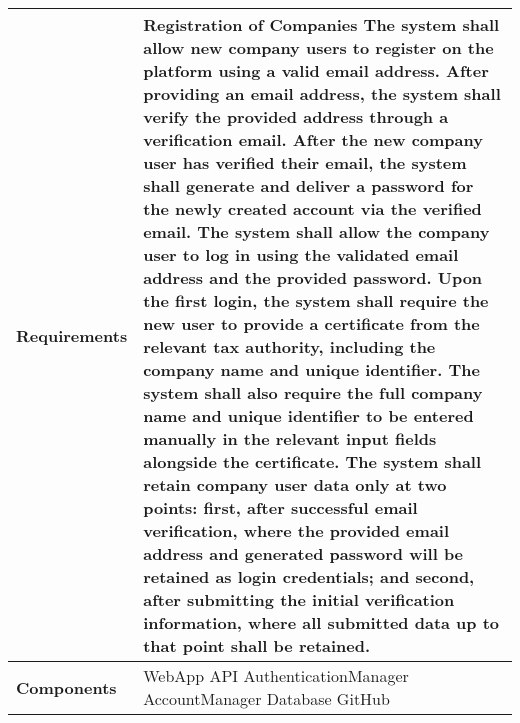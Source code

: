 \begin{table}[h]
    \centering
    \renewcommand{\arraystretch}{1.5} %
    \begin{tabular}{|C{0.3\textwidth}|L{0.65\textwidth}|} %
        \hline
        \textbf{Requirements} &    
         \textbf{Registration of Companies}
         \newline
        [FR4] The system shall allow new company users to register on the platform using a valid email address.
        \newline
        [FR5] After providing an email address, the system shall verify the provided address through a verification email. 
        \newline
        [FR6] After the new company user has verified their email, the system shall generate and deliver a password for the newly created account via the verified email. 
        \newline
        [FR7] The system shall allow the company user to log in using the validated email address and the provided password. 
        \newline
        [FR8] Upon the first login, the system shall require the new user to provide a certificate from the relevant tax authority, including the company name and unique identifier. The system shall also require the full company name and unique identifier to be entered manually in the relevant input fields alongside the certificate. 
        \newline
        [FR9] The system shall retain company user data only at two points: first, after successful email verification, where the provided email address and generated password will be retained as login credentials; and second, after submitting the initial verification information, where all submitted data up to that point shall be retained. 
        \\
        \hline
        \textbf{Components} & WebApp \newline API \newline AuthenticationManager \newline AccountManager \newline Database \newline GitHub \\
        \hline
    \end{tabular}
\end{table}

